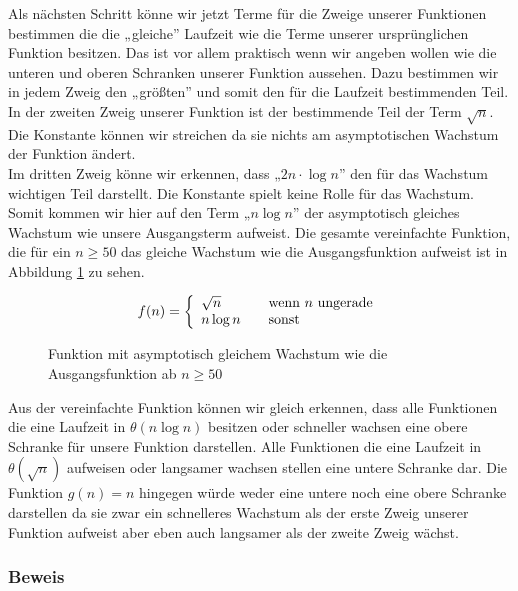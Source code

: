 \documentclass[a4paper, 12pt]{article}
\begin{document}
Als nächsten Schritt könne wir jetzt Terme für die Zweige unserer Funktionen bestimmen die die „gleiche” Laufzeit wie die Terme unserer ursprünglichen Funktion besitzen. Das ist vor allem praktisch wenn wir angeben wollen wie die unteren und oberen Schranken unserer Funktion aussehen. Dazu bestimmen wir in jedem Zweig den „größten” und somit den für die Laufzeit bestimmenden Teil.\\

In der zweiten Zweig unserer Funktion ist der bestimmende Teil der Term $\sqrt n$. Die Konstante können wir streichen da sie nichts am asymptotischen Wachstum der Funktion ändert.\\

Im dritten Zweig könne wir erkennen, dass „$2 n ⋅ \log n$” den für das Wachstum wichtigen Teil darstellt. Die Konstante spielt keine Rolle für das Wachstum. Somit kommen wir hier auf den Term „$n \log n$” der asymptotisch gleiches Wachstum wie unsere Ausgangsterm aufweist. Die gesamte vereinfachte Funktion, die für ein $n≥ 50$ das gleiche Wachstum wie die Ausgangsfunktion aufweist ist in Abbildung \ref{Figure:Vereinfachte_Funktion_Gleiches_Wachstum} zu sehen.

\begin{figure}[H]
	\caption{Funktion mit asymptotisch gleichem Wachstum wie die
	Ausgangsfunktion ab $n≥50$}
	\label{Figure:Vereinfachte_Funktion_Gleiches_Wachstum}
\[
	\label{function:Laufzeit_Vereinfacht}
	f(n) = \left\{
	\begin{array}{l l}
		\sqrt n & \quad \text{wenn $n$ ungerade}\\

		n \log n & \quad \text{sonst}
	\end{array} \right.
\]
\end{figure}

Aus der vereinfachte Funktion können wir gleich erkennen, dass alle Funktionen die eine Laufzeit in $θ\left(n \log n\right)$ besitzen oder schneller wachsen eine obere Schranke für unsere Funktion darstellen. Alle Funktionen die eine Laufzeit in $θ\left( \sqrt n\right)$ aufweisen oder langsamer wachsen stellen eine untere Schranke dar. Die Funktion $g\left(n\right)=n$ hingegen würde weder eine untere noch eine obere Schranke darstellen da sie zwar ein schnelleres Wachstum als der erste Zweig unserer Funktion aufweist aber eben auch langsamer als der zweite Zweig wächst.

\subsubsection{Beweis}
\end{document}
